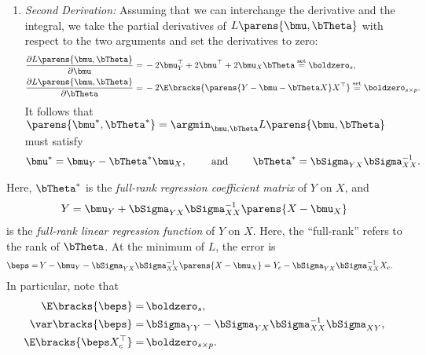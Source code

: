 \documentclass[12pt]{article}
\begin{document}
\begin{enumerate}[label=\textbf{\arabic*.}]
\begin{enumerate}
		\item \textit{Second Derivation:} Assuming that we can interchange the derivative and the integral, we take the partial derivatives of $L \parens{\bmu, \bTheta}$ with respect to the two arguments and set the derivatives to zero: 
		\begin{align*}
			\frac{\partial L \parens{\bmu, \bTheta}}{\partial \bmu} = & \, -2 \bmu_Y^\top + 2 \bmu^\top + 2 \bmu_X \bTheta \stackrel{\text{set}}{=} \boldzero_s, \\ 
			\frac{\partial L \parens{\bmu, \bTheta}}{\partial \bTheta} = & \, -2 \E \bracks{\parens{Y - \bmu - \bTheta X} X^\top} \stackrel{\text{set}}{=} \boldzero_{s \times p}. 
		\end{align*}
		It follows that $\parens{\bmu^*, \bTheta^*} = \argmin_{\bmu, \bTheta} L \parens{\bmu, \bTheta}$ must satisfy 
		\begin{align*}
			\bmu^* = \bmu_Y - \bTheta^* \bmu_X, \qquad \text{ and } \qquad \bTheta^* = \bSigma_{YX} \bSigma_{XX}^{-1}. 
		\end{align*}
	
	\end{enumerate}
	
	Here, $\bTheta^*$ is the \textit{full-rank regression coefficient matrix} of $Y$ on $X$, and 
	\begin{align*}
		Y = \bmu_Y + \bSigma_{YX} \bSigma_{XX}^{-1} \parens{X - \bmu_X}
	\end{align*}
	is the \textit{full-rank linear regression function} of $Y$ on $X$. Here, the ``full-rank'' refers to the rank of $\bTheta$. At the minimum of $L$, the error is 
	\begin{align*}
		\beps = & \, Y - \bmu_Y - \bSigma_{YX} \bSigma_{XX}^{-1} \parens{X - \bmu_X}  
		= Y_c - \bSigma_{YX} \bSigma_{XX}^{-1} X_c. 
	\end{align*}
	In particular, note that 
	\begin{align*}
		\E \bracks{\beps} = & \, \boldzero_s, \\ 
		\var \bracks{\beps} = & \, \bSigma_{YY} - \bSigma_{YX} \bSigma_{XX}^{-1} \bSigma_{XY}, \\ 
		\E \bracks{\beps X_c^\top} = & \, \boldzero_{s \times p}. 
	\end{align*}
	

\end{enumerate}
\end{document}
